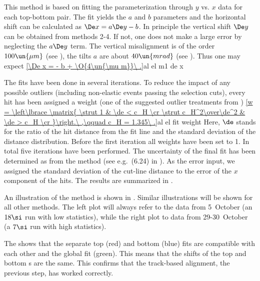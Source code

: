 

This method is based on fitting the parameterization  through $y$ vs. $x$ data for each top-bottom  pair. The fit yields the $a$ and $b$ parameters and the horizontal shift can be calculated as $\De x = a \De y - b$. In principle the vertical shift $\De y$ can be obtained from methods 2-4. If not, one does not make a large error by neglecting the $a\De y$ term. The vertical misalignment is of the order $100\un{\mu m}$ (see ), the tilts $a$ are about $40\un{mrad}$ (see ). Thus one may expect
\eqref{\De x = - b + \O{4\un{\mu m}}\ .}{al el m1 de x}

The fits have been done in several iterations. To reduce the impact of any possible outliers (including non-elastic events passing the selection cuts), every hit has been assigned a weight (one of the suggested outlier treatments from )
\eqref{w = \left\lbrace \matrix{
\strut 1				& \de < c_H \cr
\strut c_H^2\over\de^2	& \de > c_H \cr
}\right.\ ,\qquad c_H = 1.345\ .}{al el fit weight}
Here, $\de$ stands for the ratio of the hit distance from the fit line and the standard deviation of the distance distribution. Before the first iteration all weights have been set to 1. In total five iterations have been performed. The uncertainty of the final fit has been determined as from the  method (see e.g.~(6.24) in ). As the error input, we assigned the standard deviation of the cut-line distance to the error of the $x$ component of the hits. The results are summarized in .

An illustration of the method is shown in . Similar illustrations will be shown for all other methods. The left plot will always refer to the data from 5~October (an $18\si$ run with low statistics), while the right plot to data from 29-30~October (a $7\si$ run with high statistics).

The  shows that the separate top (red) and bottom (blue)  fits are compatible with each other and the global fit (green). This means that the shifts of the top and bottom s are the same. This confirms that the track-based alignment, the previous step, has worked correctly.


